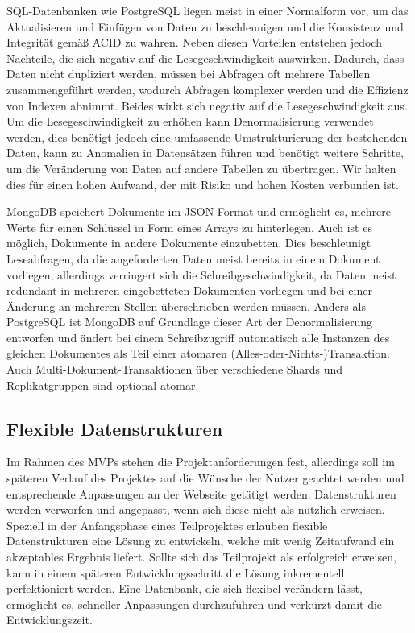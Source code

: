 SQL-Datenbanken wie PostgreSQL liegen meist in einer Normalform vor, um das Aktualisieren und Einfügen von Daten zu beschleunigen und die Konsistenz und Integrität gemäß ACID zu wahren. Neben diesen Vorteilen entstehen jedoch Nachteile, die sich negativ auf die Lesegeschwindigkeit auswirken. Dadurch, dass Daten nicht dupliziert werden, müssen bei Abfragen oft mehrere Tabellen zusammengeführt werden, wodurch Abfragen komplexer werden und die Effizienz von Indexen abnimmt. Beides wirkt sich negativ auf die Lesegeschwindigkeit aus. Um die Lesegeschwindigkeit zu erhöhen kann Denormalisierung verwendet werden, dies benötigt jedoch eine umfassende Umstrukturierung der bestehenden Daten, kann zu Anomalien in Datensätzen führen und benötigt weitere Schritte, um die Veränderung von Daten auf andere Tabellen zu übertragen. Wir halten dies für einen hohen Aufwand, der mit Risiko und hohen Kosten verbunden ist. 

MongoDB speichert Dokumente im JSON-Format und ermöglicht es, mehrere Werte für einen Schlüssel in Form eines Arrays zu hinterlegen. Auch ist es möglich, Dokumente in andere Dokumente einzubetten. Dies beschleunigt Leseabfragen, da die angeforderten Daten meist bereits in einem Dokument vorliegen, allerdings verringert sich die Schreibgeschwindigkeit, da Daten meist redundant in mehreren eingebetteten Dokumenten vorliegen und bei einer Änderung an mehreren Stellen überschrieben werden müssen. Anders als PostgreSQL ist MongoDB auf Grundlage dieser Art der Denormalisierung entworfen und ändert bei einem Schreibzugriff automatisch alle Instanzen des gleichen Dokumentes als Teil einer atomaren (Alles-oder-Nichts-)Transaktion. Auch Multi-Dokument-Transaktionen über verschiedene Shards und Replikatgruppen sind optional atomar. \cite{MG6}

\subsection{Flexible Datenstrukturen}
Im Rahmen des MVPs stehen die Projektanforderungen fest, allerdings soll im späteren Verlauf des Projektes auf die Wünsche der Nutzer geachtet werden und entsprechende Anpassungen an der Webseite getätigt werden. Datenstrukturen werden verworfen und angepasst, wenn sich diese nicht als nützlich erweisen. Speziell in der Anfangsphase eines Teilprojektes erlauben flexible Datenstrukturen eine Lösung zu entwickeln, welche mit wenig Zeitaufwand ein akzeptables Ergebnis liefert. Sollte sich das Teilprojekt als erfolgreich erweisen, kann in einem späteren Entwicklungsschritt die Lösung inkrementell perfektioniert werden. Eine Datenbank, die sich flexibel verändern lässt, ermöglicht es, schneller Anpassungen durchzuführen und verkürzt damit die Entwicklungszeit.

